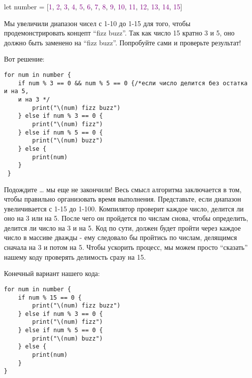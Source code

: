 let number = [\textcolor{Purple}{1}, \textcolor{Purple}{2}, \textcolor{Purple}{3}, \textcolor{Purple}{4}, \textcolor{Purple}{5}, \textcolor{Purple}{6}, \textcolor{Purple}{7}, \textcolor{Purple}{8}, \textcolor{Purple}{9}, \textcolor{Purple}{10}, \textcolor{Purple}{11}, \textcolor{Purple}{12}, \textcolor{Purple}{13}, \textcolor{Purple}{14}, \textcolor{Purple}{15}] 

\vspace{\baselineskip}

Мы увеличили диапазон чисел с 1-10 до 1-15 для того, чтобы продемонстрировать концепт “fizz buzz”. Так как число 15 кратно 3 и 5, оно должно быть заменено на “fizz buzz”. Попробуйте сами и проверьте результат!

\vspace{\baselineskip}

Вот решение:

\vspace{\baselineskip}

\begin{tcolorbox} 
\begin{verbatim}
for num in number {
	if num % 3 == 0 && num % 5 == 0 {/*если число делится без остатка и на 5,
	и на 3 */
		print("\(num) fizz buzz")
	} else if num % 3 == 0 {
		print("\(num) fizz")
	} else if num % 5 == 0 {
		print("\(num) buzz")
	} else {
		print(num)
	}
 }
\end{verbatim}
\end{tcolorbox}

\vspace{\baselineskip}

Подождите … мы еще не закончили! Весь смысл алгоритма заключается в том, чтобы правильно организовать время выполнения. Представьте, если диапазон увеличивается с 1-15 до 1-100. Компилятор проверит каждое число, делится ли оно на 3 или на 5. После чего он пройдется по числам снова, чтобы определить, делится ли число на 3 и на 5. Код по сути, должен будет пройти через каждое число в массиве дважды - ему следовало бы пройтись по числам, делящимся сначала на 3 и потом на 5. Чтобы ускорить процесс, мы можем просто “сказать” нашему коду проверять делимость сразу на 15.

\vspace{\baselineskip}

Конечный вариант нашего кода:

\vspace{\baselineskip}

\begin{tcolorbox} 
\begin{verbatim}
for num in number {
	if num % 15 == 0 {
		print("\(num) fizz buzz")
	} else if num % 3 == 0 {
		print("\(num) fizz")
	} else if num % 5 == 0 {
		print("\(num) buzz")
	} else {
		print(num)
	} 
}
\end{verbatim}
\end{tcolorbox}

